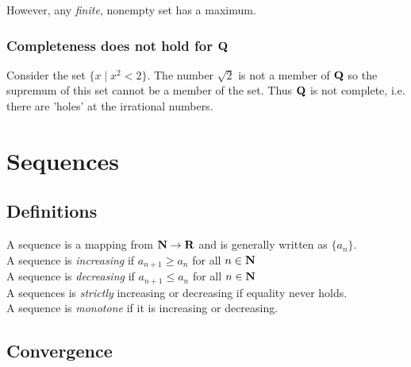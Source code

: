 \documentclass[12pt]{article}
\begin{document}
      However, any \emph{finite}, nonempty set has a maximum.
    \subsubsection{Completeness does not hold for $\mathbf{Q}$}
      Consider the set $\{x \mid x^2 < 2\}$. The number $\sqrt{2}$ is not a member of $\mathbf{Q}$ so the supremum of this
      set cannot be a member of the set. Thus $\mathbf{Q}$ is not complete, i.e. there are 'holes' at the irrational numbers.
\section{Sequences}
  \subsection{Definitions}
    A sequence is a mapping from $\mathbf{N} \to \mathbf{R}$ and is generally written as $\{a_n\}$.\\

    A sequence is \emph{increasing} if $a_{n+1} \geq a_n$ for all $n \in \mathbf{N}$\\
    A sequence is \emph{decreasing} if $a_{n+1} \leq a_n$ for all $n \in \mathbf{N}$\\
    A sequences is \emph{strictly} increasing or decreasing if equality never holds.\\
    A sequence is \emph{monotone} if it is increasing or decreasing.\\
  \subsection{Convergence}
    
\end{document}
